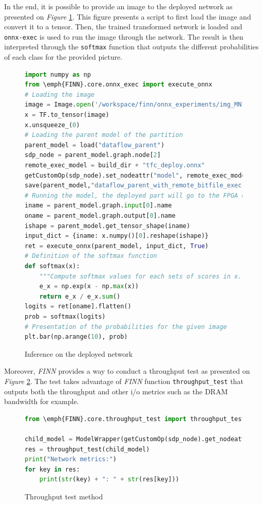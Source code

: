 In the end, it is possible to provide an image to the deployed network as presented on \emph{Figure} \ref{fig:DeployedInference}. This figure presents a script to first load the image and convert it to a tensor. Then, the trained transformed network is loaded and \texttt{onnx-exec} is used to run the image through the network. The result is then interpreted through the \texttt{softmax} function that outputs the different probabilities of each class for the provided picture.

\begin{figure}[htbp]
\centering
\begin{lstlisting}[language=Python]
import numpy as np
from \emph{FINN}.core.onnx_exec import execute_onnx
# Loading the image
image = Image.open('/workspace/finn/onnx_experiments/img_MNIST.png')
x = TF.to_tensor(image)
x.unsqueeze_(0)
# Loading the parent model of the partition
parent_model = load("dataflow_parent")
sdp_node = parent_model.graph.node[2]
remote_exec_model = build_dir + "tfc_deploy.onnx"
getCustomOp(sdp_node).set_nodeattr("model", remote_exec_model)
save(parent_model,"dataflow_parent_with_remote_bitfile_exec")
# Running the model, the deployed part will go to the FPGA once the node is reached
iname = parent_model.graph.input[0].name
oname = parent_model.graph.output[0].name
ishape = parent_model.get_tensor_shape(iname)
input_dict = {iname: x.numpy()[0].reshape(ishape)}
ret = execute_onnx(parent_model, input_dict, True)
# Definition of the softmax function
def softmax(x):
    """Compute softmax values for each sets of scores in x."""
    e_x = np.exp(x - np.max(x))
    return e_x / e_x.sum()
logits = ret[oname].flatten()
prob = softmax(logits)
# Presentation of the probabilities for the given image
plt.bar(np.arange(10), prob)
\end{lstlisting}
\caption[Deployed Inference]{Inference on the deployed network}
  \label{fig:DeployedInference}
\end{figure}

Moreover, \emph{FINN} provides a way to conduct a throughput test as presented on \emph{Figure} \ref{fig:ThroughputTest}. The test takes advantage of \emph{FINN} function \texttt{throughput\_test} that outputs both the throughput and other i/o metrics such as the DRAM bandwidth for example.

\begin{figure}[htbp]
\centering
\begin{lstlisting}[language=Python]
from \emph{FINN}.core.throughput_test import throughput_test

child_model = ModelWrapper(getCustomOp(sdp_node).get_nodeattr("model"))
res = throughput_test(child_model)
print("Network metrics:")
for key in res:
    print(str(key) + ": " + str(res[key]))
\end{lstlisting}
\caption[Throughput Test]{Throughput test method}
  \label{fig:ThroughputTest}
\end{figure}
